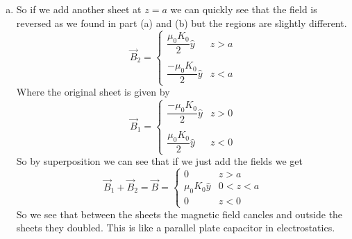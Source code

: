 \documentclass[11pt]{article}
\numberwithin{equation}{section}
\begin{document}
\begin{enumerate}[(a)]
\item
So if we add another sheet at $z=a$ we can quickly see that the field is reversed as we found in part (a) and (b) but the regions are slightly different.
$$\vec{B}_2 = \left\{\begin{array}{lc}
	\dfrac{\mu_0K_0}{2}\hat{y}	&z>a\\
\\
	\dfrac{-\mu_0K_0}{2}\hat{y}	&z<a
	\end{array}\right.$$
Where the original sheet is given by
$$\vec{B}_1 = \left\{\begin{array}{lc}
	\dfrac{-\mu_0K_0}{2}\hat{y}	&z>0\\
\\
	\dfrac{\mu_0K_0}{2}\hat{y}	&z<0
	\end{array}\right.$$
So by superposition we can see that if we just add the fields we get
$$\vec{B}_1 + \vec{B}_2 = \vec{B} = \left\{\begin{array}{lc}
	0			&z>a\\
	{\mu_0K_0}\hat{y}	&0<z<a\\
	0			&z<0
	\end{array}\right.$$
So we see that between the sheets the magnetic field cancles and outside the sheets they doubled. This is like a parallel plate capacitor in electrostatics.

\end{enumerate}
\end{document}
